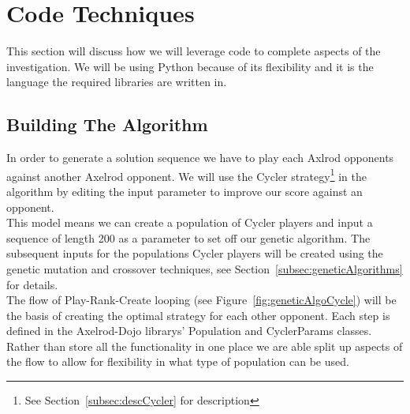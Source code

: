 \section{Code Techniques}\label{sec:codeTechniques}
This section will discuss how we will leverage code to complete aspects of the investigation.
We will be using Python because of its flexibility and it is the language the required libraries are written in.

\subsection{Building The Algorithm}\label{subsec:buildingTheAlgorthem}
In order to generate a solution sequence we have to play each Axlrod opponents against another Axelrod opponent.
We will use the Cycler strategy\footnote{See Section~\ref{subsec:descCycler} for description} in the algorithm by editing the input parameter to improve our score against an opponent.\\

This model means we can create a population of Cycler players and input a sequence of length 200 as a parameter to set off our genetic algorithm.
The subsequent inputs for the populations Cycler players will be created using the genetic mutation and crossover techniques, see Section~\ref{subsec:geneticAlgorithms} for details.\\

The flow of Play-Rank-Create looping (see Figure~\ref{fig:geneticAlgoCycle}) will be the basis of creating the optimal strategy for each other opponent.
Each step is defined in the Axelrod-Dojo librarys' Population and CyclerParams classes.
Rather than store all the functionality in one place we are able split up aspects of the flow to allow for flexibility in what type of population can be used.

